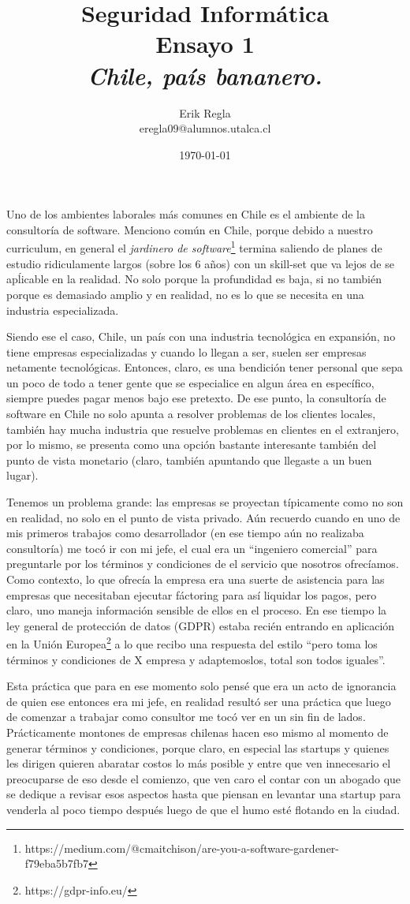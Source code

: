\documentclass[11pt]{utalcaDoc}
\title{{\bf Seguridad Informática}\\ Ensayo 1 \\\textit{Chile, país bananero.}}
\author{Erik Regla\\ eregla09@alumnos.utalca.cl}
\date{\today}
\begin{document}
\maketitle

Uno de los ambientes laborales más comunes en Chile es el ambiente de la consultoría de software. Menciono común en Chile, porque debido a nuestro curriculum, en general el \textit{jardinero de software}\footnote{https://medium.com/@cmaitchison/are-you-a-software-gardener-f79eba5b7fb7} termina saliendo de planes de estudio ridiculamente largos (sobre los 6 años) con un skill-set que va lejos de se apĺicable en la realidad. No solo porque la profundidad es baja, si no también porque es demasiado amplio y en realidad, no es lo que se necesita en una industria especializada.

Siendo ese el caso, Chile, un país con una industria tecnológica en expansión, no tiene empresas especializadas y cuando lo llegan a ser, suelen ser empresas netamente tecnológicas. Entonces, claro, es una bendición tener personal que sepa un poco de todo a tener gente que se especialice en algun área en específico, siempre puedes pagar menos bajo ese pretexto. De ese punto, la consultoría de software en Chile no solo apunta a resolver problemas de los clientes locales, también hay mucha industria que resuelve problemas en clientes en el extranjero, por lo mismo, se presenta como una opción bastante interesante también del punto de vista monetario (claro, también apuntando que llegaste a un buen lugar).

Tenemos un problema grande: las empresas se proyectan típicamente como no son en realidad, no solo en el punto de vista privado. Aún recuerdo cuando en uno de mis primeros trabajos como desarrollador (en ese tiempo aún no realizaba consultoría) me tocó ir con mi jefe, el cual era un ``ingeniero comercial'' para preguntarle por los términos y condiciones de el servicio que nosotros ofrecíamos. Como contexto, lo que ofrecía la empresa era una suerte de asistencia para las empresas que necesitaban ejecutar fáctoring para así liquidar los pagos, pero claro, uno maneja información sensible de ellos en el proceso. En ese tiempo la ley general de protección de datos (GDPR) estaba recién entrando en aplicación en la Unión Europea\footnote{https://gdpr-info.eu/} a lo que recibo una respuesta del estilo ``pero toma los términos y condiciones de X empresa y adaptemoslos, total son todos iguales''.

Esta práctica que para en ese momento solo pensé que era un acto de ignorancia de quien ese entonces era mi jefe, en realidad resultó ser una práctica que luego de comenzar a trabajar como consultor me tocó ver en un sin fin de lados. Prácticamente montones de empresas chilenas hacen eso mismo al momento de generar términos y condiciones, porque claro, en especial las startups y quienes les dirigen quieren abaratar costos lo más posible y entre que ven innecesario el preocuparse de eso desde el comienzo, que ven caro el contar con un abogado que se dedique a revisar esos aspectos hasta que piensan en levantar una startup para venderla al poco tiempo después luego de que el humo esté flotando en la ciudad.
\end{document}
